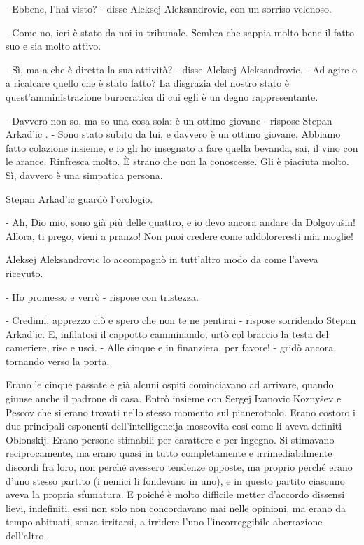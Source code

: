 - Ebbene, l'hai visto? - disse Aleksej Aleksandrovic, con un sorriso velenoso. 

- Come no, ieri è stato da noi in tribunale. Sembra che sappia molto bene il fatto suo e sia molto attivo. 

- Sì, ma a che è diretta la sua attività? - disse Aleksej Aleksandrovic. - Ad agire o a ricalcare quello che è stato fatto? La disgrazia del nostro stato è quest'amministrazione burocratica di cui egli è un degno rappresentante. 

- Davvero non so, ma so una cosa sola: è un ottimo giovane - rispose Stepan Arkad'ic . - Sono stato subito da lui, e davvero è un ottimo giovane. Abbiamo fatto colazione insieme, e io gli ho insegnato a fare quella bevanda, sai, il vino con le arance. Rinfresca molto. È strano che non la conoscesse. Gli è piaciuta molto. Sì, davvero è una simpatica persona. 

Stepan Arkad'ic guardò l'orologio. 

- Ah, Dio mio, sono già più delle quattro, e io devo ancora andare da Dolgovušin! Allora, ti prego, vieni a pranzo! Non puoi credere come addoloreresti mia moglie! 

Aleksej Aleksandrovic lo accompagnò in tutt'altro modo da come l'aveva ricevuto. 

- Ho promesso e verrò - rispose con tristezza. 

- Credimi, apprezzo ciò e spero che non te ne pentirai - rispose sorridendo Stepan Arkad'ic. E, infilatosi il cappotto camminando, urtò col braccio la testa del cameriere, rise e uscì. - Alle cinque e in finanziera, per favore! - gridò ancora, tornando verso la porta. 

\label{ix-3} 

Erano le cinque passate e già alcuni ospiti cominciavano ad arrivare, quando giunse anche il padrone di casa. Entrò insieme con Sergej Ivanovic Koznyšev e Pescov che si erano trovati nello stesso momento sul pianerottolo. Erano costoro i due principali esponenti dell'intelligencija moscovita così come li aveva definiti Oblonskij. Erano persone stimabili per carattere e per ingegno. Si stimavano reciprocamente, ma erano quasi in tutto completamente e irrimediabilmente discordi fra loro, non perché avessero tendenze opposte, ma proprio perché erano d'uno stesso partito (i nemici li fondevano in uno), e in questo partito ciascuno aveva la propria sfumatura. E poiché è molto difficile metter d'accordo dissensi lievi, indefiniti, essi non solo non concordavano mai nelle opinioni, ma erano da tempo abituati, senza irritarsi, a irridere l'uno l'incorreggibile aberrazione dell'altro. 

